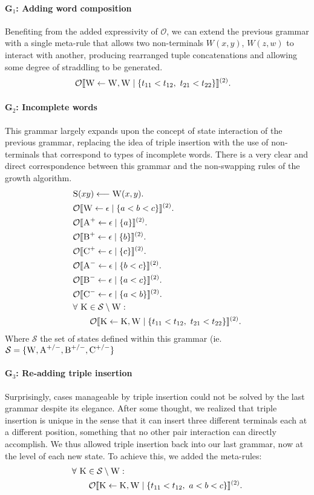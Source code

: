\documentclass[nonatbib,numbers,10pt]{sigplanconf}
\newcommand\s{\textsc}
\newcommand{\Orderr}[5]{
	\mathcal{#1}\llbracket #2 \leftarrow #3 \mid \{ #4 \} \rrbracket^{(#5)}.
}
\newcommand{\Or}[4]{\Orderr{O}{#1}{#2}{#3}{#4}}
\begin{document}
\paragraph{G$_1$: Adding word composition}
Benefiting from the added expressivity of $\mathcal{O}$, we can extend the previous grammar with a single meta-rule that allows two non-terminals $W(x,y)$, $W(z,w)$ to interact with another, producing rearranged tuple concatenations and allowing some degree of straddling to be generated.
\begin{align*}
&\Or{\s{W}}{\s{W}, \s{W}}{t_{11} < t_{12},\ t_{21} < t_{22}}{2}
\end{align*}

\paragraph{G$_2$: Incomplete words}
This grammar largely expands upon the concept of state interaction of the previous grammar, replacing the idea of triple insertion with the use of non-terminals that correspond to types of incomplete words. There is a very clear and direct correspondence between this grammar and the non-swapping rules of the growth algorithm.
\begin{align*}
&\s{S}(xy) \longleftarrow \s{W}(x,y). \\
&\Or{\s{W}}{\epsilon}{a < b < c}{2} \\
&\Or{\s{A}^+}{\epsilon}{a}{2} \\
&\Or{\s{B}^+}{\epsilon}{b}{2} \\
&\Or{\s{C}^+}{\epsilon}{c}{2} \\
&\Or{\s{A}^-}{\epsilon}{b < c}{2} \\
&\Or{\s{B}^-}{\epsilon}{a < c}{2} \\
&\Or{\s{C}^-}{\epsilon}{a < b}{2} \\
&\forall \ \s{K} \in \mathcal{S} \setminus \s{W}:\\ 
&\quad\quad\Or{\s{K}}{\s{K}, \s{W}}{t_{11} < t_{12},\ t_{21} < t_{22}}{2}
\end{align*}
Where $\mathcal{S}$ the set of states defined within this grammar (ie. $\mathcal{S}= \{\textsc{W}, \textsc{A}^{+/-}, \textsc{B}^{+/-}, \textsc{C}^{+/-}\}$
\paragraph{G$_3$: Re-adding triple insertion}
Surprisingly, cases manageable by triple insertion could not be solved by the last grammar despite its elegance. After some thought, we realized that triple insertion is unique in the sense that it can insert three different terminals each at a different position, something that no other pair interaction can directly accomplish. We thus allowed triple insertion back into our last grammar, now at the level of each new state. To achieve this, we added the meta-rules:
\begin{align*}
&\forall \ \s{K} \in \mathcal{S} \setminus \s{W}:\\ 
&\quad\quad\Or{\s{K}}{\s{K}, \s{W}}{t_{11} < t_{12},\ a < b < c}{2}
\end{align*}
\end{document}
